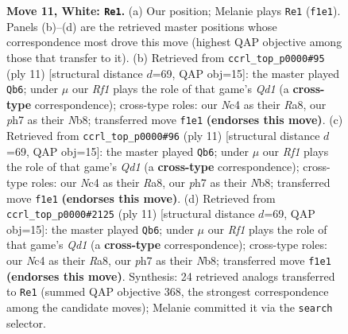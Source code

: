 \documentclass[11pt]{article}
\begin{document}
\begin{figure}[p]
\caption{\textbf{Move 11, White: \texttt{Re1}.} (a) Our position; Melanie plays \texttt{Re1} (\texttt{f1e1}). Panels (b)--(d) are the retrieved master positions whose correspondence most drove this move (highest QAP objective among those that transfer to it). (b) Retrieved from \texttt{ccrl\_top\_p0000\#95} (ply 11) [structural distance $d$=69, QAP obj=15]: the master played \texttt{Qb6}; under $\mu$ our \emph{Rf1} plays the role of that game's \emph{Qd1} (a \textbf{cross-type} correspondence); cross-type roles: our \emph{N}c4 as their \emph{R}a8, our \emph{p}h7 as their \emph{N}b8; transferred move \texttt{f1e1} \textbf{(endorses this move)}. (c) Retrieved from \texttt{ccrl\_top\_p0000\#96} (ply 11) [structural distance $d$=69, QAP obj=15]: the master played \texttt{Qb6}; under $\mu$ our \emph{Rf1} plays the role of that game's \emph{Qd1} (a \textbf{cross-type} correspondence); cross-type roles: our \emph{N}c4 as their \emph{R}a8, our \emph{p}h7 as their \emph{N}b8; transferred move \texttt{f1e1} \textbf{(endorses this move)}. (d) Retrieved from \texttt{ccrl\_top\_p0000\#2125} (ply 11) [structural distance $d$=69, QAP obj=15]: the master played \texttt{Qb6}; under $\mu$ our \emph{Rf1} plays the role of that game's \emph{Qd1} (a \textbf{cross-type} correspondence); cross-type roles: our \emph{N}c4 as their \emph{R}a8, our \emph{p}h7 as their \emph{N}b8; transferred move \texttt{f1e1} \textbf{(endorses this move)}. Synthesis: 24 retrieved analogs transferred to \texttt{Re1} (summed QAP objective 368, the strongest correspondence among the candidate moves); Melanie committed it via the \texttt{search} selector.}
\label{fig:thought-m20}
\end{figure}

\clearpage
\end{document}
